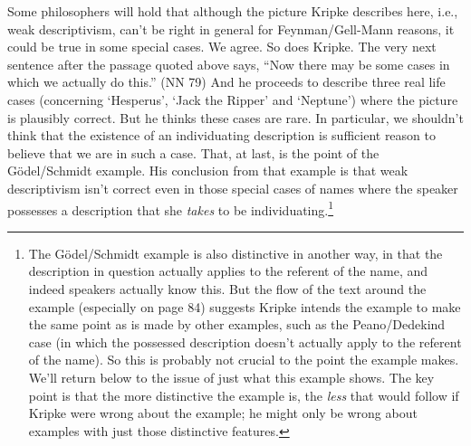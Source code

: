 \documentclass[
  11pt,
  letterpaper,
  DIV=11,
  numbers=noendperiod,
  twoside]{scrartcl}
\begin{document}
Some philosophers will hold that although the picture Kripke describes
here, i.e., weak descriptivism, can't be right in general for
Feynman/Gell-Mann reasons, it could be true in some special cases. We
agree. So does Kripke. The very next sentence after the passage quoted
above says, ``Now there may be some cases in which we actually do
this.'' (NN 79) And he proceeds to describe three real life cases
(concerning `Hesperus', `Jack the Ripper' and `Neptune') where the
picture is plausibly correct. But he thinks these cases are rare. In
particular, we shouldn't think that the existence of an individuating
description is sufficient reason to believe that we are in such a case.
That, at last, is the point of the Gödel/Schmidt example. His conclusion
from that example is that weak descriptivism isn't correct even in those
special cases of names where the speaker possesses a description that
she \emph{takes} to be individuating.\footnote{The Gödel/Schmidt example
  is also distinctive in another way, in that the description in
  question actually applies to the referent of the name, and indeed
  speakers actually know this. But the flow of the text around the
  example (especially on page 84) suggests Kripke intends the example to
  make the same point as is made by other examples, such as the
  Peano/Dedekind case (in which the possessed description doesn't
  actually apply to the referent of the name). So this is probably not
  crucial to the point the example makes. We'll return below to the
  issue of just what this example shows. The key point is that the more
  distinctive the example is, the \emph{less} that would follow if
  Kripke were wrong about the example; he might only be wrong about
  examples with just those distinctive features.}
\end{document}
